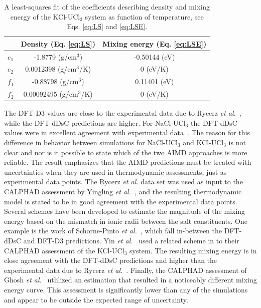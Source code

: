 \documentclass[preprint,3p,10pt,twocolumn,number,sort&compress]{elsarticle}
\begin{document}
\begin{table}[hb!]
\centering
\small
\begin{tabular}{lcc}
\hline
\hline
&Density (Eq. \ref{eq:LS}) &Mixing energy (Eq. \ref{eq:LSE}) \\
\hline
$e_1$ &-1.8779 (g/cm$^3$) &-0.50144 (eV) \\
$e_2$ &0.0012398 (g/cm$^3$/K) &0 (eV/K)\\
$f_1$ &-0.88798 (g/cm$^3$) &0.11401 (eV) \\
$f_2$ &0.00092495 (g/cm$^3$/K) &0 (eV/K)\\
\hline
\hline
\end{tabular}
\caption{A least-squares fit of the coefficients describing density and mixing energy of the KCl-UCl$_3$ system as function of temperature, see Eqs. \ref{eq:LS} and \ref{eq:LSE}.}
\label{table:LS}
\end{table}

The DFT-D3 values are close to the experimental data due to Rycerz \textit{et al.}~\cite{Rycerz}, while the DFT-dDsC predictions are higher. For NaCl-UCl$_3$ the DFT-dDsC values were in excellent agreement with experimental data~\cite{Andersson}. The reason for this difference in behavior between simulations for NaCl-UCl$_3$ and KCl-UCl$_3$ is not clear and nor is it possible to state which of the two AIMD approaches is more reliable. The result emphasizes that the AIMD predictions must be treated with uncertainties when they are used in thermodynamic assessments, just as experimental data points. 
The Rycerz \textit{et al.} data set was used as input to the CALPHAD assessment by Yingling \textit{et al.}~\cite{Yingling}, and the resulting thermodynamic model is stated to be in good agreement with the experimental data points.
Several schemes have been developed to estimate the magnitude of the mixing energy based on the mismatch in ionic radii between the salt constituents. One example is the work of Schorne-Pinto \textit{et al.}~\cite{Pinto}, which fall in-between the DFT-dDsC and DFT-D3 predictions.
Yin \textit{et al.}~\cite{YIN2020} used a related scheme in to their CALPHAD assessment of the KCl-UCl$_3$ system. The resulting mixing energy is in close agreement with the DFT-dDsC predictions and higher than the experimental data due to Rycerz \textit{et al.}~\cite{Rycerz}. Finally, the CALPHAD assessment of Ghosh \textit{et al.}~\cite{Ghosh} utlilized an estimation that resulted in a noticeably different mixing energy curve. This assessment is significantly lower than any of the simulations and appear to be outside the expected range of uncertainty. 
\end{document}
